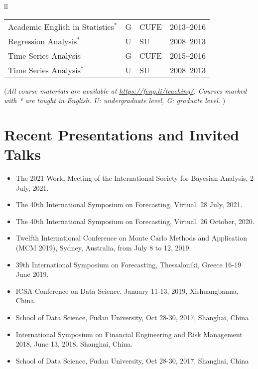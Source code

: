 \documentclass[twoside,a4paper,10.5pt]{article}
\begin{document}
\begin{tabular}{ll}
\begin{center}
\begin{tabular}{p{6.5cm}lll}
  {Academic English in Statistics}$^*$   & G    & CUFE          & 2013--2016 \\
  {Regression Analysis}$^*$              & U    & SU            & 2008--2013 \\
  {Time Series Analysis}                 & G    & CUFE          & 2015--2016 \\
  {Time Series Analysis}$^*$             & U    & SU            & 2008--2013 \\
    \bottomrule
  \end{tabular}
\end{center}
{\footnotesize (\emph{All course materials are available at
    \emph{\url{https://feng.li/teaching/}}. Courses marked with * are taught in English. U: undergraduate level, G: graduate level. })}


\section*{Recent Presentations and Invited Talks}
\begin{itemize}

\item The 2021 World Meeting of the International Society for Bayesian Analysis, 2 July, 2021.

\item The 40th International Symposium on Forecasting, Virtual. 28 July, 2021.

\item The 40th International Symposium on Forecasting, Virtual. 26 October, 2020.

\item Twelfth International Conference on Monte Carlo Methods and Application (MCM 2019), Sydney, Australia, from July 8 to 12, 2019.

\item 39th International Symposium on Forecasting, Thessaloniki, Greece 16-19 June 2019.

\item ICSA Conference on Data Science, January 11-13, 2019, Xishuangbanna, China.

\item School of Data Science, Fudan University, Oct 28-30, 2017, Shanghai, China

\item International Symposium on Financial Engineering and Risk Management 2018, June 13, 2018, Shanghai, China.

\item School of Data Science, Fudan University, Oct 28-30, 2017, Shanghai, China


\end{itemize}
\end{tabular}
\end{document}
